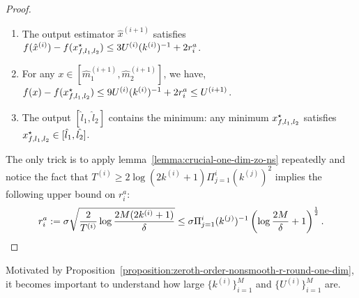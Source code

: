 \begin{proof}
\begin{enumerate}
\item The output estimator $\hat{x}^{(i+1)}$ satisfies $f(\hat{x}^{(i)}) - f(x_{f, l_1, l_2}^\star)
	\leq 3U^{(i)} (k^{(i)})^{-1} + 2r_i^a$. 
\item For any $x \in [\hat{m}_1^{(i+1)}, \hat{m}_2^{(i+1)}]$, we have, 
	$f(x) - f(x_{f, l_1, l_2}^\star) \leq 9U^{(i)} (k^{(i)})^{-1} + 2r_i^a \leq U^{(i+1)}$. 
\item The output $[\hat{l}_1, \hat{l}_2]$ contains the minimum:
	 any minimum $x_{f, l_1, l_2}^\star$ satisfies $x_{f, l_1, l_2}^\star \in [\hat{l}_1, \hat{l_2}]$. 
\end{enumerate} 
The only trick is to apply lemma~\ref{lemma:crucial-one-dim-zo-ns} repeatedly and notice the 
fact that $T^{(i)} \geq 2\log(2k^{(i)}+1) \Pi_{j=1}^i (k^{(j)})^2$ implies the following upper bound
on $r_i^a$: 
\begin{equation*}
r_i^a := \sigma \sqrt{\frac{2}{T^{(i)}} \log \frac{2M(2k^{(i)} + 1)}{\delta}} 
	\leq \sigma \Pi_{j=1}^i ({k^{(j)}})^{-1} \left(\log \frac{2M}{\delta} + 1\right)^{\frac{1}{2}}.
\end{equation*}
\end{proof}

Motivated by Proposition~\ref{proposition:zeroth-order-nonsmooth-r-round-one-dim}, 
it becomes important to understand how large $\{k^{(i)}\}_{i=1}^M$ and $\{U^{(i)}\}_{i=1}^M$
are. 

